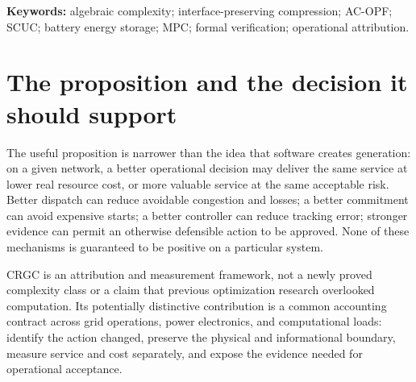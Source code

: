 \documentclass[11pt,letterpaper]{article}
\begin{document}
\begin{abstract}
Computationally Recoverable Grid Capability (CRGC) is a proposed framework for measuring additional electrical service or avoided real resource cost attributable to a computational intervention under matched operational constraints. This integrated research checkpoint combines mathematical construction and empirical attribution. We retain a precise account of the claimed VP/VNP separation, conditional proof-audit interfaces, and the distinction between algebraic representation and optimization complexity. We formalize conditions for exact or bounded-loss reconstruction, examine homogeneous storage aggregation and heterogeneous failure modes, and retain both positive representation-compression results and null findings against stronger baselines. We distinguish service, energy, economic value, reliability, deliverability and dependable capacity, rather than treating them as one additive resource. A staged experimental campaign specifies adaptive storage compression, formal verification, structural AC-OPF, unit commitment and forecast-aware large-load coordination. The original national billion-dollar arithmetic is preserved only as motivation. No production solver superiority, field savings, regional recovery estimate or accredited capacity has been established. This version merges earlier reported results and derivations; it does not claim new executions or an exhaustive literature review.
\end{abstract}
\textbf{Keywords:} algebraic complexity; interface-preserving compression; AC-OPF; SCUC; battery energy storage; MPC; formal verification; operational attribution.
\clearpage\tableofcontents\clearpage{}
\section{The proposition and the decision it should support}
\label{sec:proposition}
The useful proposition is narrower than the idea that software creates generation: on a given network, a better operational decision may deliver the same service at lower real resource cost, or more valuable service at the same acceptable risk. Better dispatch can reduce avoidable congestion and losses; a better commitment can avoid expensive starts; a better controller can reduce tracking error; stronger evidence can permit an otherwise defensible action to be approved. None of these mechanisms is guaranteed to be positive on a particular system.

CRGC is an attribution and measurement framework, not a newly proved complexity class or a claim that previous optimization research overlooked computation. Its potentially distinctive contribution is a common accounting contract across grid operations, power electronics, and computational loads: identify the action changed, preserve the physical and informational boundary, measure service and cost separately, and expose the evidence needed for operational acceptance.
\end{document}
